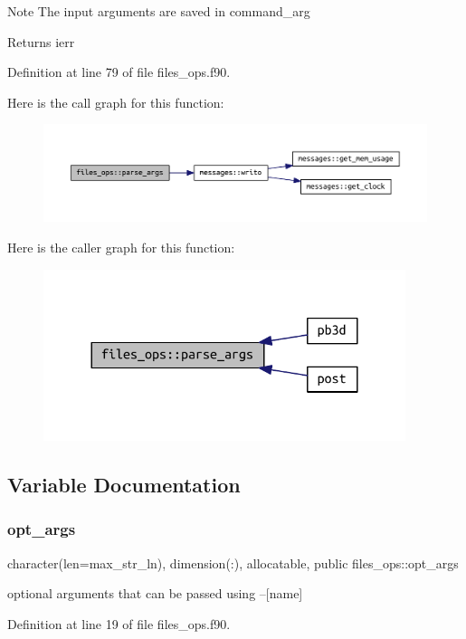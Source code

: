 \begin{DoxyNote}{Note}
The input arguments are saved in {\ttfamily command\+\_\+arg} 
\end{DoxyNote}
\begin{DoxyReturn}{Returns}
ierr 
\end{DoxyReturn}


Definition at line 79 of file files\+\_\+ops.\+f90.

Here is the call graph for this function\+:\nopagebreak
\begin{figure}[H]
\begin{center}
\leavevmode
\includegraphics[width=350pt]{namespacefiles__ops_a051584112f6e4f6e60b0ef824dffbf5e_cgraph}
\end{center}
\end{figure}
Here is the caller graph for this function\+:\nopagebreak
\begin{figure}[H]
\begin{center}
\leavevmode
\includegraphics[width=300pt]{namespacefiles__ops_a051584112f6e4f6e60b0ef824dffbf5e_icgraph}
\end{center}
\end{figure}


\subsection{Variable Documentation}
\mbox{\label{namespacefiles__ops_a0666bcbf3aa6a9969e6dc563a40e7152}} 
\subsubsection{\texorpdfstring{opt\+\_\+args}{opt\_args}}
{\footnotesize\ttfamily character(len=max\+\_\+str\+\_\+ln), dimension(\+:), allocatable, public files\+\_\+ops\+::opt\+\_\+args}



optional arguments that can be passed using {\ttfamily --\mbox{[}name\mbox{]}} 



Definition at line 19 of file files\+\_\+ops.\+f90.

